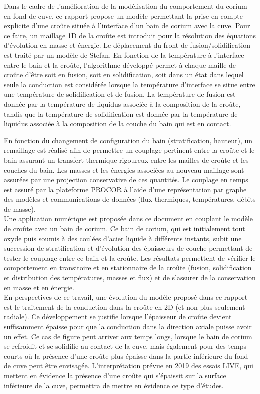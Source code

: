 Dans le cadre de l'amélioration de la modélisation du comportement du corium en fond de cuve, ce rapport propose un modèle permettant la prise en compte explicite d'une croûte située à l'interface d'un bain de corium avec la cuve. Pour ce faire, un maillage 1D de la croûte est introduit pour la résolution des équations d'évolution en masse et énergie. Le déplacement du front de fusion/solidification est traité par un modèle de Stefan. En fonction de la température à l'interface entre le bain et la croûte, l'algorithme développé permet à chaque maille de croûte d'être soit en fusion, soit en solidification, soit dans un état dans lequel seule la conduction est considérée lorsque la température d'interface se situe entre une température de solidification et de fusion. La température de fusion est donnée par la température de liquidus associée à la composition de la croûte, tandis que la température de solidification est donnée par la température de liquidus associée à la composition de la couche du bain qui est en contact. 

En fonction du changement de configuration du bain (stratification, hauteur), un remaillage est réalisé afin de permettre un couplage pertinent entre la croûte et le bain assurant un transfert thermique rigoureux entre les mailles de croûte et les couches du bain. Les masses et les énergies associées au nouveau maillage sont assurées par une projection conservative de ces quantités. Le couplage en temps est assuré par la plateforme PROCOR à l'aide d'une représentation par graphe des modèles et communications de données (flux thermiques, températures, débits de masse).\\

Une application numérique est proposée dans ce document en couplant le modèle de croûte avec un bain de corium. Ce bain de corium, qui est initialement tout oxyde puis soumis à des coulées d'acier liquide à différents instants, subit une succession de stratification et d'évolution des épaisseurs de couche permettant de tester le couplage entre ce bain et la croûte. Les résultats permettent de vérifier le comportement en transitoire et en stationnaire de la croûte (fusion, solidification et distribution des températures, masses et flux) et de s'assurer de la conservation en masse et en énergie.\\

En perspectives de ce travail, une évolution du modèle proposé dans ce rapport est le traitement de la conduction dans la croûte en 2D (et non plus seulement radiale). Ce développement se justifie lorsque l'épaisseur de croûte devient suffisamment épaisse pour que la conduction dans la direction axiale puisse avoir un effet. Ce cas de figure peut arriver aux temps longs, lorsque le bain de corium se refroidit et se solidifie au contact de la cuve, mais également pour des temps courts où la présence d'une croûte plus épaisse dans la partie inférieure du fond de cuve peut être envisagée. L'interprétation prévue en 2019 des essais LIVE, qui mettent en évidence la présence d'une croûte qui s'épaissit sur la surface inférieure de la cuve, permettra de mettre en évidence ce type d'études. 

